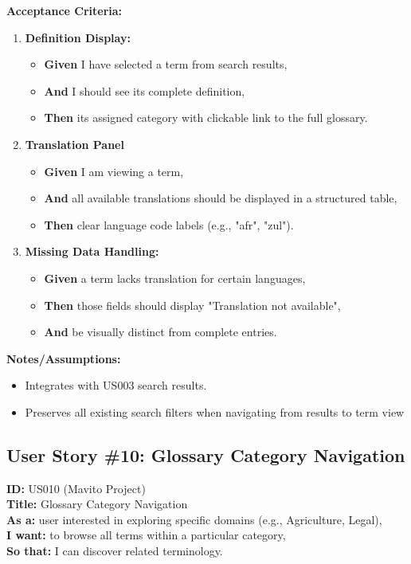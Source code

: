 \documentclass[12pt]{article}
\begin{document}
\vspace{1em}
\textbf{Acceptance Criteria:}
\begin{enumerate}
    \item \textbf{Definition Display:}
    \begin{itemize}
        \item \textbf{Given} I have selected a term from search results,
        \item \textbf{And}  I should see its complete definition,
        \item \textbf{Then} its assigned category with clickable link to the full glossary.
    \end{itemize}

    \item \textbf{Translation Panel}
    \begin{itemize}
        \item \textbf{Given} I am viewing a term,
        \item \textbf{And} all available translations should be displayed in a structured table,
        \item \textbf{Then} clear language code labels (e.g., "afr", "zul").
    \end{itemize}

    \item \textbf{Missing Data Handling:}
    \begin{itemize}
        \item \textbf{Given} a term lacks translation for certain languages,
        \item \textbf{Then} those fields should display "Translation not available",
        \item \textbf{And} be visually distinct from complete entries.
    \end{itemize}
\end{enumerate}

\vspace{1em}
\textbf{Notes/Assumptions:}
\begin{itemize}
    \item Integrates with US003 search results.
    \item Preserves all existing search filters when navigating from results to term view
\end{itemize}

\subsection{User Story \#10: Glossary Category Navigation}
\textbf{ID:} US010 (Mavito Project) \\
\textbf{Title:} Glossary Category Navigation \\
\textbf{As a:} user interested in exploring specific domains (e.g., Agriculture, Legal), \\
\textbf{I want:} to browse all terms within a particular category,\\
\textbf{So that:} I can discover related terminology.
\end{document}

